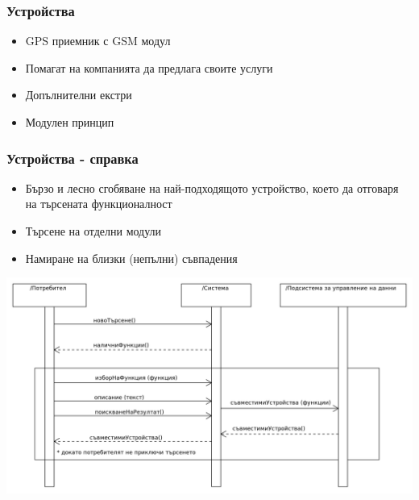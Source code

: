 \begin{frame}
  \frametitle{Устройства}
  \begin{itemize}
    \item GPS приемник с GSM модул
    \item Помагат на компанията да предлага своите услуги
    \item Допълнителни екстри
    \item Модулен принцип
  \end{itemize}
\end{frame}

\begin{frame}
  \frametitle{Устройства - справка}
  \begin{itemize}
    \item Бързо и лесно сгобяване на най-подходящото устройство, което да отговаря на търсената функционалност
    \item Търсене на отделни модули
    \item Намиране на близки (непълни) съвпадения
  \end{itemize}
\end{frame}

\begin{frame}
  \includegraphics[width= 0.85\paperwidth]{../diagrams/ssd-uc4.png}
\end{frame}
